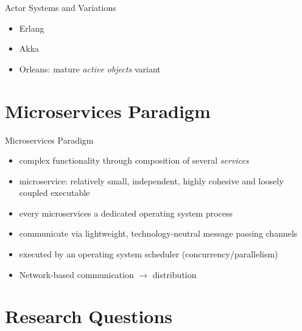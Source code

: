 \documentclass{beamer}
\begin{document}

\begin{frame}{Actor Systems and Variations}

\begin{itemize}
  \item Erlang
  \item Akka
  \item Orleans: mature \textit{active objects} variant
\end{itemize}
  

\end{frame}


\section{Microservices Paradigm}


\begin{frame}{Microservices Paradigm}

\begin{itemize}
  \item complex functionality through composition of several \textit{services}
  \item microservice: relatively small, independent, highly cohesive and loosely coupled executable
  \item every microservices a dedicated operating system process
  \item communicate via lightweight, technology-neutral message passing channels
  \item executed by an operating system scheduler (concurrency/parallelism)
  \item Network-based communication $\rightarrow$ distribution
\end{itemize}

\end{frame}


\section{Research Questions}

\end{document}
